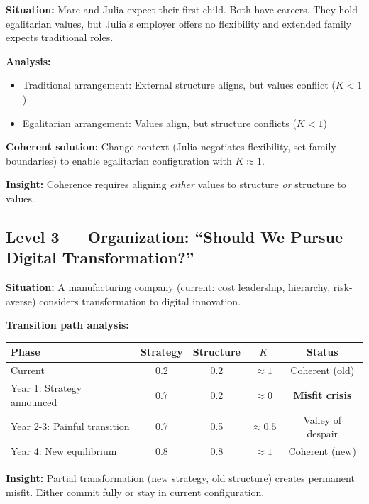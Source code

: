\begin{tcolorbox}[colback=orange!5!white, colframe=orange!75!black,
    title=\textbf{Worked Example L=2: Household Coordination}]

\textbf{Situation:} Marc and Julia expect their first child. Both have careers.
They hold egalitarian values, but Julia's employer offers no flexibility
and extended family expects traditional roles.

\textbf{Analysis:}
\begin{itemize}[nosep]
    \item Traditional arrangement: External structure aligns, but values conflict ($K < 1$)
    \item Egalitarian arrangement: Values align, but structure conflicts ($K < 1$)
\end{itemize}

\textbf{Coherent solution:}
Change context (Julia negotiates flexibility, set family boundaries)
to enable egalitarian configuration with $K \approx 1$.

\textbf{Insight:} Coherence requires aligning \emph{either} values to structure \emph{or} structure to values.

\end{tcolorbox}

\subsection{Level 3 — Organization: ``Should We Pursue Digital Transformation?''}

\begin{tcolorbox}[colback=orange!5!white, colframe=orange!75!black,
    title=\textbf{Worked Example L=3: Organizational Change}]

\textbf{Situation:} A manufacturing company (current: cost leadership, hierarchy, risk-averse)
considers transformation to digital innovation.

\textbf{Transition path analysis:}
\begin{center}
\small
\begin{tabular}{@{}lcccc@{}}
\hline
\textbf{Phase} & \textbf{Strategy} & \textbf{Structure} & \textbf{$K$} & \textbf{Status} \\
\hline
Current & 0.2 & 0.2 & $\approx 1$ & Coherent (old) \\
Year 1: Strategy announced & 0.7 & 0.2 & $\approx 0$ & \textbf{Misfit crisis} \\
Year 2-3: Painful transition & 0.7 & 0.5 & $\approx 0.5$ & Valley of despair \\
Year 4: New equilibrium & 0.8 & 0.8 & $\approx 1$ & Coherent (new) \\
\hline
\end{tabular}
\end{center}

\textbf{Insight:} Partial transformation (new strategy, old structure) creates permanent misfit.
Either commit fully or stay in current configuration.

\end{tcolorbox}

